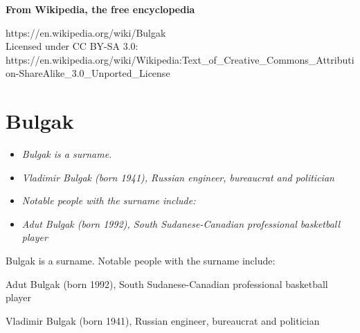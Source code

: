 \textbf{From Wikipedia, the free encyclopedia}

https://en.wikipedia.org/wiki/Bulgak\\
Licensed under CC BY-SA 3.0:\\
https://en.wikipedia.org/wiki/Wikipedia:Text\_of\_Creative\_Commons\_Attribution-ShareAlike\_3.0\_Unported\_License

\section{Bulgak}\label{bulgak}

\begin{itemize}
\item
  \emph{Bulgak is a surname.}
\item
  \emph{Vladimir Bulgak (born 1941), Russian engineer, bureaucrat and
  politician}
\item
  \emph{Notable people with the surname include:}
\item
  \emph{Adut Bulgak (born 1992), South Sudanese-Canadian professional
  basketball player}
\end{itemize}

Bulgak is a surname. Notable people with the surname include:

Adut Bulgak (born 1992), South Sudanese-Canadian professional basketball
player

Vladimir Bulgak (born 1941), Russian engineer, bureaucrat and politician
